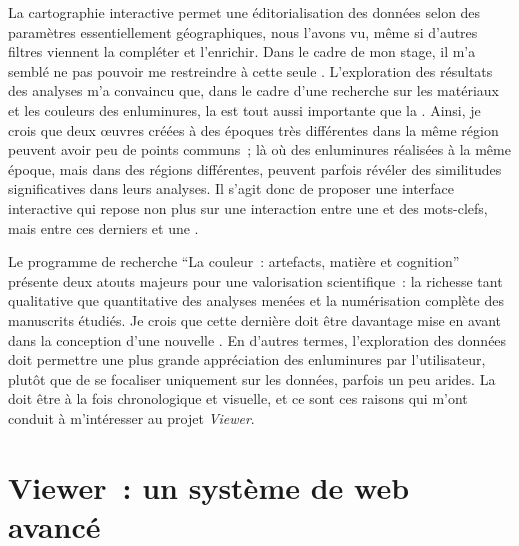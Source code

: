 La cartographie interactive permet une éditorialisation des données selon des paramètres essentiellement géographiques, nous l’avons vu, même si d’autres filtres viennent la compléter et l’enrichir. Dans le cadre de mon stage, il m’a semblé ne pas pouvoir me restreindre à cette seule . L’exploration des résultats des analyses m’a convaincu que, dans le cadre d’une recherche sur les matériaux et les couleurs des enluminures, la  est tout aussi importante que la . Ainsi, je crois que deux œuvres créées à des époques très différentes dans la même région peuvent avoir peu de points communs~; là où des enluminures réalisées à la même époque, mais dans des régions différentes, peuvent parfois révéler des similitudes significatives dans leurs analyses. Il s’agit donc de proposer une interface interactive qui repose non plus sur une interaction entre une  et des mots-clefs, mais entre ces derniers et une .\par
Le programme de recherche \enquote{La couleur~: artefacts, matière et cognition} présente deux atouts majeurs pour une valorisation scientifique~: la richesse tant qualitative que quantitative des analyses menées et la numérisation complète des manuscrits étudiés. Je crois que cette dernière doit être davantage mise en avant dans la conception d’une nouvelle . En d’autres termes, l'exploration des données doit permettre une plus grande appréciation des enluminures par l'utilisateur, plutôt que de se focaliser uniquement sur les données, parfois un peu arides. La  doit être à la fois chronologique et visuelle, et ce sont ces raisons qui m’ont conduit à m’intéresser au projet \textit{ Viewer}.\newpage

\section{ Viewer~: un système de  web avancé}

